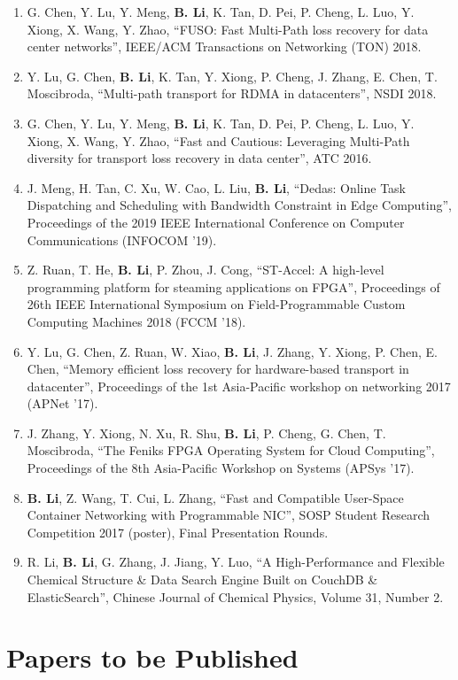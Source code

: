 \begin{publications}
\begin{enumerate}
\item G. Chen, Y. Lu, Y. Meng, \textbf{B. Li}, K. Tan, D. Pei, P. Cheng, L. Luo, Y. Xiong, X. Wang, Y. Zhao, ``FUSO: Fast Multi-Path loss recovery for data center networks'', IEEE/ACM Transactions on Networking (TON) 2018.
\item Y. Lu, G. Chen, \textbf{B. Li}, K. Tan, Y. Xiong, P. Cheng, J. Zhang, E. Chen, T. Moscibroda, ``Multi-path transport for RDMA in datacenters'', NSDI 2018.
\item G. Chen, Y. Lu, Y. Meng, \textbf{B. Li}, K. Tan, D. Pei, P. Cheng, L. Luo, Y. Xiong, X. Wang, Y. Zhao, “Fast and Cautious: Leveraging Multi-Path diversity for transport loss recovery in data center”, ATC 2016.
\item J. Meng, H. Tan, C. Xu, W. Cao, L. Liu, \textbf{B. Li}, ``Dedas: Online Task Dispatching and Scheduling with Bandwidth Constraint in Edge Computing'', Proceedings of the 2019 IEEE International Conference on Computer Communications (INFOCOM '19).
\item Z. Ruan, T. He, \textbf{B. Li}, P. Zhou, J. Cong, “ST-Accel: A high-level programming platform for steaming applications on FPGA”, Proceedings of 26th IEEE International Symposium on Field-Programmable Custom Computing Machines 2018 (FCCM '18).
\item Y. Lu, G. Chen, Z. Ruan, W. Xiao, \textbf{B. Li}, J. Zhang, Y. Xiong, P. Chen, E. Chen, ``Memory efficient loss recovery for hardware-based transport in datacenter'', Proceedings of the 1st Asia-Pacific workshop on networking 2017 (APNet '17).
\item J. Zhang, Y. Xiong, N. Xu, R. Shu, \textbf{B. Li}, P. Cheng, G. Chen, T. Moscibroda, ``The Feniks FPGA Operating System for Cloud Computing'', Proceedings of the 8th Asia-Pacific Workshop on Systems (APSys '17).
\item \textbf{B. Li}, Z. Wang, T. Cui, L. Zhang, ``Fast and Compatible User-Space Container Networking with Programmable NIC'', SOSP Student Research Competition 2017 (poster), Final Presentation Rounds.
\item R. Li, \textbf{B. Li}, G. Zhang, J. Jiang, Y. Luo, ``A High-Performance and Flexible Chemical Structure \& Data Search Engine Built on CouchDB \& ElasticSearch'', Chinese Journal of Chemical Physics, Volume 31, Number 2.
\end{enumerate}

\section*{Papers to be Published}


\end{publications}
